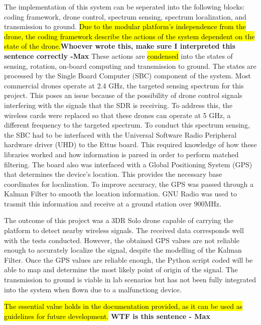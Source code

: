 The implementation of this system can be seperated into the following blocks: coding framework, drone control, spectrum sensing, spectrum localization, and transmission to ground. \hl{Due to the modular platform's independence from the drone, the coding framework describe the actions of the system dependent on the state of the drone.}\textbf{Whoever wrote this, make sure I interpreted this sentence correctly -Max} These actions are \hl{condensed} into the states of sensing, rotation, on-board computing and transmission to ground. The states are processed by the Single Board Computer (SBC) component of the system. Most commercial drones operate at 2.4 GHz, the targeted sensing spectrum for this project. This poses an issue because of the possibility of drone control signals interfering with the signals that the SDR is receiving. To address this, the wireless cards were replaced so that these drones can operate at 5 GHz, a different frequency to the targeted spectrum. To conduct this spectrum sensing, the SBC had to be interfaced with the Universal Software Radio Peripheral hardware driver (UHD) to the Ettus board. This required knowledge of how these libraries worked and how information is parsed in order to perform matched filtering. The board also was interfaced with a Global Positioning System (GPS) that determines the device's location. This provides the necessary base coordinates for localization. To improve accuracy, the GPS was passed through a Kalman Filter to smooth the location information. GNU Radio was used to trasmit this information and receive at a ground station over 900MHz. \par

The outcome of this project was a 3DR Solo drone capable of carrying the platform to detect nearby wireless signals. The received data corresponds well with the tests conducted. However, the obtained GPS values are not reliable enough to accurately localize the signal, despite the modelling of the Kalman Filter. Once the GPS values are reliable enough, the Python script coded will be able to map and determine the most likely point of origin of the signal. The transmission to ground is viable in lab scenarios but has not been fully integrated into the system when flown due to a malfunctiong device. \par

\hl{The essential value holds in the documentation provided, as it can be used as guidelines for future development.} \textbf{WTF is this sentence - Max}